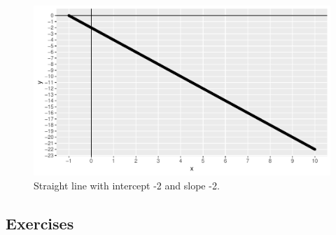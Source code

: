 \documentclass[]{book}\usepackage[]{graphicx}\usepackage[]{color}
\makeatletter
\def\maxwidth{ %
  \ifdim\Gin@nat@width>\linewidth
    \linewidth
  \else
    \Gin@nat@width
  \fi
}
\newenvironment{knitrout}{}{} %
\makeatother
\begin{document}
\begin{knitrout}
\color{fgcolor}\begin{figure}

{\centering \includegraphics[width=\maxwidth]{figure/lm_3-1} 

}

\caption[Straight line with intercept -2 and slope -2]{Straight line with intercept -2 and slope -2.}\label{fig:lm_3}
\end{figure}


\end{knitrout}

\subsection{Exercises}
\end{document}
